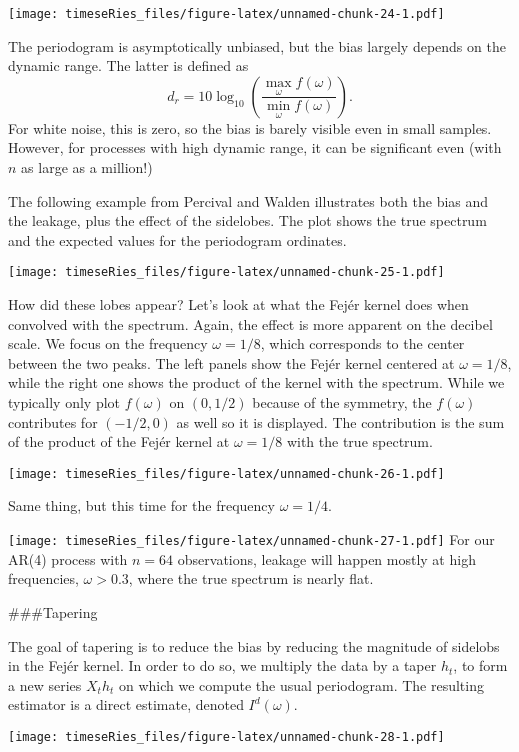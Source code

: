 \documentclass[]{book}
\begin{document}
\texttt{[image: timeseRies\_files/figure-latex/unnamed-chunk-24-1.pdf]}

The periodogram is asymptotically unbiased, but the bias largely depends
on the dynamic range. The latter is defined as
\[d_r = 10 \log_{10} \left( \frac{\max_{\omega}f(\omega)}{\min_{\omega}f(\omega)}\right).\]
For white noise, this is zero, so the bias is barely visible even in
small samples. However, for processes with high dynamic range, it can be
significant even (with \(n\) as large as a million!)

The following example from Percival and Walden illustrates both the bias
and the leakage, plus the effect of the sidelobes. The plot shows the
true spectrum and the expected values for the periodogram ordinates.

\texttt{[image: timeseRies\_files/figure-latex/unnamed-chunk-25-1.pdf]}

How did these lobes appear? Let's look at what the Fejér kernel does
when convolved with the spectrum. Again, the effect is more apparent on
the decibel scale. We focus on the frequency \(\omega=1/8\), which
corresponds to the center between the two peaks. The left panels show
the Fejér kernel centered at \(\omega=1/8\), while the right one shows
the product of the kernel with the spectrum. While we typically only
plot \(f(\omega)\) on \((0,1/2)\) because of the symmetry, the
\(f(\omega)\) contributes for \((-1/2,0)\) as well so it is displayed.
The contribution is the sum of the product of the Fejér kernel at
\(\omega=1/8\) with the true spectrum.

\texttt{[image: timeseRies\_files/figure-latex/unnamed-chunk-26-1.pdf]}

Same thing, but this time for the frequency \(\omega = 1/4\).

\texttt{[image: timeseRies\_files/figure-latex/unnamed-chunk-27-1.pdf]}
For our AR(4) process with \(n=64\) observations, leakage will happen
mostly at high frequencies, \(\omega > 0.3\), where the true spectrum is
nearly flat.

\#\#\#Tapering

The goal of tapering is to reduce the bias by reducing the magnitude of
sidelobs in the Fejér kernel. In order to do so, we multiply the data by
a taper \(h_t\), to form a new series \(X_th_t\) on which we compute the
usual periodogram. The resulting estimator is a direct estimate, denoted
\(I^d(\omega)\).

\texttt{[image: timeseRies\_files/figure-latex/unnamed-chunk-28-1.pdf]}
\end{document}
